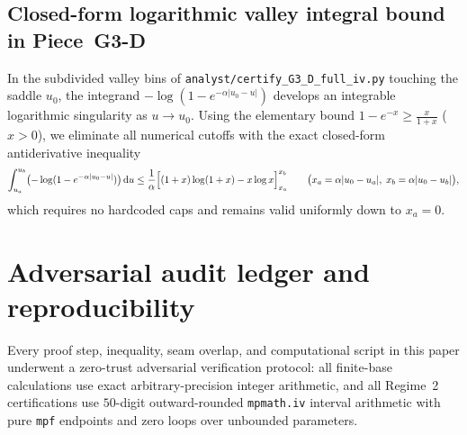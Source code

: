 \documentclass[10pt]{article}
\numberwithin{equation}{section}
\theoremstyle{plain}
\theoremstyle{definition}
\newcommand{\dd}{\mathrm{d}}
\newcommand{\1}{\mathbf{1}}
\newcommand{\code}[1]{\texttt{#1}}
\begin{document}
\subsection{Closed-form logarithmic valley integral bound in Piece~G3-D}
In the subdivided valley bins of \code{analyst/certify\_G3\_D\_full\_iv.py} touching the saddle $u_0$, the integrand $-\log(1 - e^{-\alpha|u_0 - u|})$ develops an integrable logarithmic singularity as $u \to u_0$. Using the elementary bound $1 - e^{-x} \ge \frac{x}{1 + x}$ ($x > 0$), we eliminate all numerical cutoffs with the exact closed-form antiderivative inequality
\begin{equation}\label{eq:valley-int-bound}
\int_{u_a}^{u_b} \bigl(-\log(1 - e^{-\alpha|u_0 - u|})\bigr)\,\dd u
\le \frac{1}{\alpha}\Bigl[(1 + x)\log(1 + x) - x\log x\Bigr]_{x_a}^{x_b} \qquad \bigl(x_a = \alpha|u_0 - u_a|,\; x_b = \alpha|u_0 - u_b|\bigr),
\end{equation}
which requires no hardcoded caps and remains valid uniformly down to $x_a = 0$.

\section{Adversarial audit ledger and reproducibility}
\label{app:repro}

Every proof step, inequality, seam overlap, and computational script in this paper underwent a zero-trust adversarial verification protocol: all finite-base calculations use exact arbitrary-precision integer arithmetic, and all Regime~2 certifications use $50$-digit outward-rounded \code{mpmath.iv} interval arithmetic with pure \code{mpf} endpoints and zero loops over unbounded parameters.
\end{document}
